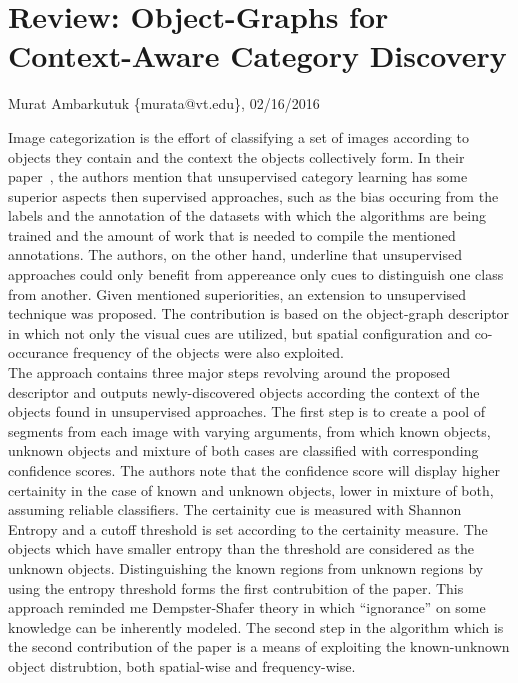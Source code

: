 \documentclass[11pt]{article}
\begin{document}
\thispagestyle{empty}
\section*{Review: Object-Graphs for Context-Aware Category Discovery}
\begin{flushright}
	\small{Murat Ambarkutuk \{murata@vt.edu\}, 02/16/2016}
\end{flushright}
Image categorization is the effort of classifying a set of images according to objects they contain and the context the objects collectively form.
In their paper~\cite{lee2012object}, the authors mention that unsupervised category learning has some superior aspects then supervised approaches, such as the bias occuring from the labels and the annotation of the datasets with which the algorithms are being trained and the amount of work that is needed to compile the mentioned annotations.
The authors, on the other hand, underline that unsupervised approaches could only benefit from appereance only cues to distinguish one class from another.
Given mentioned superiorities, an extension to unsupervised technique was proposed.
The contribution is based on the object-graph descriptor in which not only the visual cues are utilized, but spatial configuration and co-occurance frequency of the objects were also exploited.\@ \\
\indent The approach contains three major steps revolving around the proposed descriptor and outputs newly-discovered objects according the context of the objects found in unsupervised approaches. %
The first step is to create a pool of segments from each image with varying arguments, from which known objects, unknown objects and mixture of both cases are classified with corresponding confidence scores.
The authors note that the confidence score will display higher certainity in the case of known and unknown objects, lower in mixture of both, assuming reliable classifiers.
The certainity cue is measured with Shannon Entropy and a cutoff threshold is set according to the certainity measure.
The objects which have smaller entropy than the threshold are considered as the unknown objects.
Distinguishing the known regions from unknown regions by using the entropy threshold forms the first contrubition of the paper.
This approach reminded me Dempster-Shafer theory in which ``ignorance'' on some knowledge can be inherently modeled.
The second step in the algorithm which is the second contribution of the paper is a means of exploiting the known-unknown object distrubtion, both spatial-wise and frequency-wise.
\end{document}
